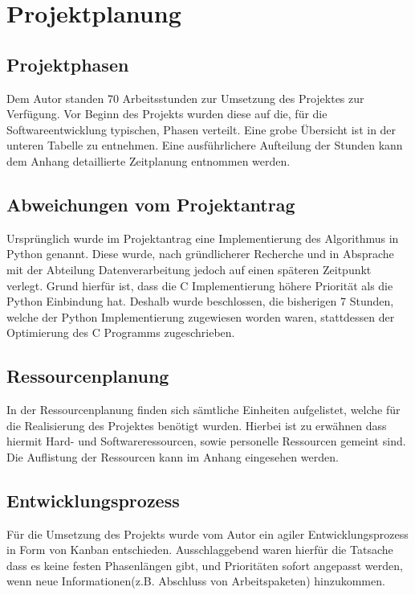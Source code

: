 \section{Projektplanung}
\subsection{Projektphasen}
Dem Autor standen 70 Arbeitsstunden zur Umsetzung des Projektes zur Verfügung.
Vor Beginn des Projekts wurden diese auf die, für die Softwareentwicklung
typischen, Phasen verteilt. Eine grobe Übersicht ist in der unteren Tabelle zu
entnehmen. Eine ausführlichere Aufteilung der Stunden kann dem Anhang
detaillierte Zeitplanung entnommen werden.




\subsection{Abweichungen vom Projektantrag}
Ursprünglich wurde im Projektantrag eine Implementierung des Algorithmus in
Python genannt. Diese wurde, nach gründlicherer Recherche und in Absprache mit der
Abteilung Datenverarbeitung jedoch auf einen späteren Zeitpunkt verlegt. Grund
hierfür ist, dass die C Implementierung höhere Priorität als die Python Einbindung hat.
Deshalb wurde beschlossen, die bisherigen 7 Stunden, welche der Python Implementierung
zugewiesen worden waren, stattdessen der Optimierung des C Programms zugeschrieben.

\subsection{Ressourcenplanung}
In der Ressourcenplanung finden sich sämtliche Einheiten aufgelistet, welche für
 die Realisierung des Projektes benötigt wurden. Hierbei ist zu erwähnen dass
 hiermit Hard- und Softwareressourcen, sowie personelle Ressourcen gemeint sind.
 Die Auflistung der Ressourcen kann im Anhang eingesehen werden.



\subsection{Entwicklungsprozess}
Für die Umsetzung des Projekts wurde vom Autor ein agiler Entwicklungsprozess in
Form von Kanban entschieden. Ausschlaggebend waren hierfür die Tatsache dass es
keine festen Phasenlängen gibt, und Prioritäten sofort angepasst werden, wenn
neue Informationen(z.B. Abschluss von Arbeitspaketen) hinzukommen.\par

